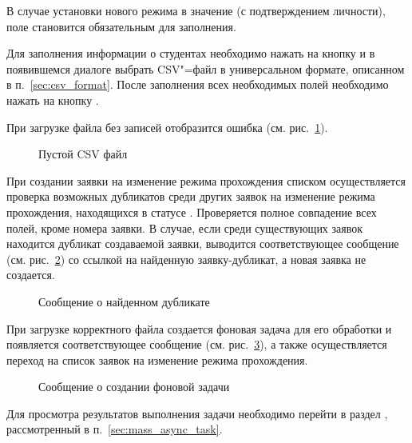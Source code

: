 В случае установки нового режима в значение  (с подтверждением личности), поле  
становится обязательным для заполнения. 


Для заполнения информации о студентах необходимо нажать на кнопку  и в появившемся диалоге выбрать 
CSV"=файл в универсальном формате, описанном в п.~\ref{sec:csv_format}. 
После заполнения всех необходимых полей необходимо нажать на кнопку .

При загрузке файла без записей отобразится ошибка (см. рис.~\ref{img:student:req_mass_change_mode_empty_csv}).
\begin{figure}[H]
	\caption{Пустой CSV файл}
	\label{img:student:req_mass_change_mode_empty_csv}
\end{figure}

При создании заявки на изменение режима прохождения списком осуществляется проверка возможных дубликатов среди других 
заявок на изменение режима прохождения, находящихся в статусе . 
Проверяется полное совпадение всех полей, кроме номера заявки. 
В случае, если среди существующих заявок находится дубликат создаваемой заявки, выводится соответствующее сообщение 
(см. рис.~\ref{img:student:req_mass_change_mode_duplicate_msg}) со ссылкой на найденную заявку-дубликат, 
а новая заявка не создается.

\begin{figure}[H]
	\caption{Сообщение о найденном дубликате}
	\label{img:student:req_mass_change_mode_duplicate_msg}
\end{figure}


При загрузке корректного файла создается фоновая задача для его обработки и появляется соответствующее сообщение 
(см. рис.~\ref{img:student:req_mass_change_mode_task}), а также осуществляется переход на список заявок на 
изменение режима прохождения.

\begin{figure}[H]
	\caption{Сообщение о создании фоновой задачи}
	\label{img:student:req_mass_change_mode_task}
\end{figure}
Для просмотра результатов выполнения задачи необходимо перейти в раздел , 
рассмотренный в п.~\ref{sec:mass_async_task}.